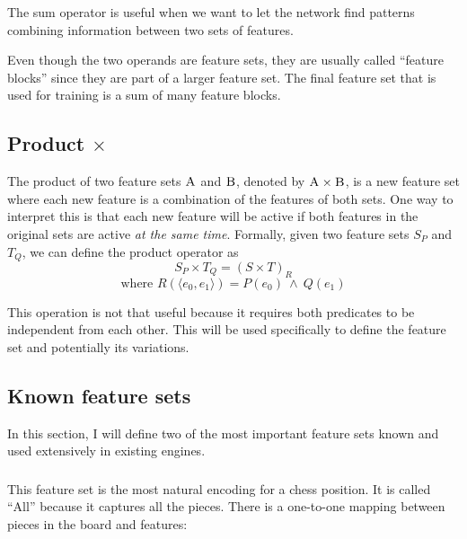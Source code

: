 The sum operator is useful when we want to let the network find patterns combining information between two sets of features.

Even though the two operands are feature sets, they are usually called \enquote{feature blocks} since they are part of a larger feature set. The final feature set that is used for training is a sum of many feature blocks.

\subsection{Product $\times$}

The product of two feature sets $\textsc{A}$ and $\textsc{B}$, denoted by $\textsc{A} \times \textsc{B}$, is a new feature set where each new feature is a combination of the features of both sets. One way to interpret this is that each new feature will be active if both features in the original sets are active \textit{at the same time}. Formally, given two feature sets $S_P$ and $T_Q$, we can define the product operator as
\begin{equation*}
S_P \times T_Q = {(S \times T)}_{R}
\end{equation*}
\begin{equation*}
\text{where } R(\langle e_0, e_1 \rangle) = P(e_0)\ \land\ Q(e_1)
\end{equation*}

This operation is not that useful because it requires both predicates to be independent from each other. This will be used specifically to define the  feature set and potentially its variations.

\newpage
\subsection{Known feature sets}

In this section, I will define two of the most important feature sets known and used extensively in existing engines.

\subsubsection{\mdseries{}}

This feature set is the most natural encoding for a chess position. It is called \enquote{All} because it captures all the pieces. There is a one-to-one mapping between pieces in the board and features:

